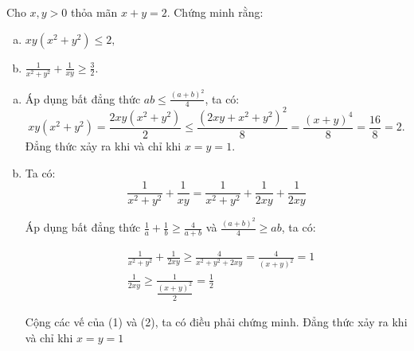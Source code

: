 \begin{problem}
Cho $x, y > 0$ thỏa mãn $x + y = 2$. Chứng minh rằng:

\begin{enumerate}[(a)]
    \item $xy(x^2 + y^2) \le 2,$
    \item $\displaystyle \frac{1}{x^2 + y^2} + \frac{1}{xy} \ge \frac{3}{2}.$
\end{enumerate}

\solution

\begin{enumerate}[(a)]
    \item
    Áp dụng bất đẳng thức $\displaystyle ab \le \frac{(a + b)^2}{4}$, ta có:
    $$
        xy(x^2 + y^2) = \frac{2xy(x^2 + y^2)}{2} \le \frac{(2xy + x^2 + y^2)^2}{8} = 
        \frac{(x + y)^4}{8} = \frac{16}{8} = 2.
    $$
    Đẳng thức xảy ra khi và chỉ khi $x = y = 1$.

    \item
    Ta có:
    $$
        \frac{1}{x^2 + y^2} + \frac{1}{xy} = \frac{1}{x^2 + y^2} + \frac{1}{2xy} + \frac{1}{2xy}
    $$

    Áp dụng bất đẳng thức $\displaystyle \frac{1}{a} + \frac{1}{b} \ge \frac{4}{a + b}$ và 
    $\displaystyle \frac{(a + b)^2}{4} \ge ab$, ta có:

    \begin{align}
        &\frac{1}{x^2 + y^2} + \frac{1}{2xy} \ge \frac{4}{x^2 + y^2 + 2xy} = \frac{4}{(x + y)^2} = 1 \\
        &\frac{1}{2xy} \ge \frac{1}{\dfrac{(x + y)^2}{2}} = \frac{1}{2}
    \end{align}

    Cộng các vế của (1) và (2), ta có điều phải chứng minh. Đẳng thức xảy ra khi và chỉ khi $x = y = 1$
\end{enumerate}

\end{problem}